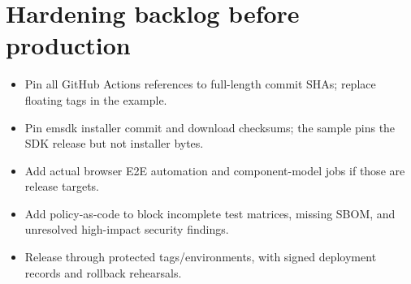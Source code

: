 \documentclass[11pt,letterpaper]{article}
\begin{document}
\section{Hardening backlog before production}
\begin{itemize}
\item Pin all GitHub Actions references to full-length commit SHAs; replace floating tags in the example.
\item Pin emsdk installer commit and download checksums; the sample pins the SDK release but not installer bytes.
\item Add actual browser E2E automation and component-model jobs if those are release targets.
\item Add policy-as-code to block incomplete test matrices, missing SBOM, and unresolved high-impact security findings.
\item Release through protected tags/environments, with signed deployment records and rollback rehearsals.
\end{itemize}
\end{document}
